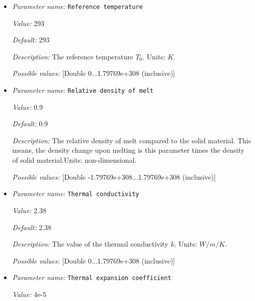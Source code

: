 \begin{itemize}
{\it Description:} The value of the specific heat $cp$. Units: $J/kg/K$.


{\it Possible values:} [Double 0...1.79769e+308 (inclusive)]
\item {\it Parameter name:} {\tt Reference temperature}
\label{parameters:Material model/Latent heat melt/Reference temperature}


{\it Value:} 293


{\it Default:} 293


{\it Description:} The reference temperature $T_0$. Units: $K$.


{\it Possible values:} [Double 0...1.79769e+308 (inclusive)]
\item {\it Parameter name:} {\tt Relative density of melt}
\label{parameters:Material model/Latent heat melt/Relative density of melt}


{\it Value:} 0.9


{\it Default:} 0.9


{\it Description:} The relative density of melt compared to the solid material. This means, the density change upon melting is this parameter times the density of solid material.Units: non-dimensional.


{\it Possible values:} [Double -1.79769e+308...1.79769e+308 (inclusive)]
\item {\it Parameter name:} {\tt Thermal conductivity}
\label{parameters:Material model/Latent heat melt/Thermal conductivity}


{\it Value:} 2.38


{\it Default:} 2.38


{\it Description:} The value of the thermal conductivity $k$. Units: $W/m/K$.


{\it Possible values:} [Double 0...1.79769e+308 (inclusive)]
\item {\it Parameter name:} {\tt Thermal expansion coefficient}
\label{parameters:Material model/Latent heat melt/Thermal expansion coefficient}


{\it Value:} 4e-5



\end{itemize}
